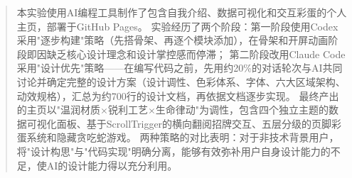\begin{abstract}
本实验使用AI编程工具制作了包含自我介绍、数据可视化和交互彩蛋的个人主页，部署于GitHub Pages。
实验经历了两个阶段：第一阶段使用Codex采用"逐步构建"策略（先搭骨架、再逐个模块添加），在骨架和开屏动画阶段即因缺乏核心设计理念和设计掌控感而停滞；
第二阶段改用Claude Code采用"设计优先"策略——在编写代码之前，先用约20\%的对话轮次与AI共同讨论并确定完整的设计方案（设计调性、色彩体系、字体、六大区域架构、动效规格），汇总为约700行的设计文档，再依据文档逐步实现。
最终产出的主页以"温润材质$\times$锐利工艺$\times$生命律动"为调性，包含四个独立主题的数据可视化面板、基于ScrollTrigger的横向翻阅招牌交互、五层分级的页脚彩蛋系统和隐藏贪吃蛇游戏。
两种策略的对比表明：对于非技术背景用户，将"设计构思"与"代码实现"明确分离，能够有效弥补用户自身设计能力的不足，使AI的设计能力得以充分利用。
\end{abstract}
